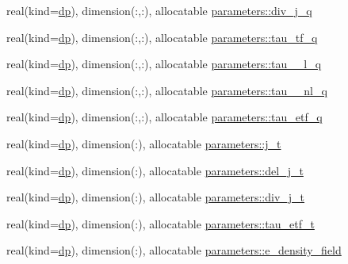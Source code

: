 \begin{DoxyCompactItemize}
real(kind=\mbox{\hyperlink{namespaceparameters_a52f8c6351fd79345d8811e065bcbbb37}{dp}}), dimension(\+:,\+:), allocatable \mbox{\hyperlink{group__OTHER__DENSITIES_ga8181dfebaf3cbf23118c8322b1eed86d}{parameters\+::div\+\_\+j\+\_\+q}}
\item 
real(kind=\mbox{\hyperlink{namespaceparameters_a52f8c6351fd79345d8811e065bcbbb37}{dp}}), dimension(\+:,\+:), allocatable \mbox{\hyperlink{group__OTHER__DENSITIES_gab6c3712299b2394aa1cdc011d9373ab8}{parameters\+::tau\+\_\+tf\+\_\+q}}
\item 
real(kind=\mbox{\hyperlink{namespaceparameters_a52f8c6351fd79345d8811e065bcbbb37}{dp}}), dimension(\+:,\+:), allocatable \mbox{\hyperlink{group__OTHER__DENSITIES_ga045973682837700d382d75a8f6de7d9c}{parameters\+::tau\+\_\+\_\+l\+\_\+q}}
\item 
real(kind=\mbox{\hyperlink{namespaceparameters_a52f8c6351fd79345d8811e065bcbbb37}{dp}}), dimension(\+:,\+:), allocatable \mbox{\hyperlink{group__OTHER__DENSITIES_ga64b5af532da52ba869f0fba447812146}{parameters\+::tau\+\_\+\_\+nl\+\_\+q}}
\item 
real(kind=\mbox{\hyperlink{namespaceparameters_a52f8c6351fd79345d8811e065bcbbb37}{dp}}), dimension(\+:,\+:), allocatable \mbox{\hyperlink{group__OTHER__DENSITIES_ga8fa22b66605b27eaece8dbd54577ebc8}{parameters\+::tau\+\_\+etf\+\_\+q}}
\item 
real(kind=\mbox{\hyperlink{namespaceparameters_a52f8c6351fd79345d8811e065bcbbb37}{dp}}), dimension(\+:), allocatable \mbox{\hyperlink{group__OTHER__DENSITIES_ga403b0aed00d1b8df4af16d47bc09977f}{parameters\+::j\+\_\+t}}
\item 
real(kind=\mbox{\hyperlink{namespaceparameters_a52f8c6351fd79345d8811e065bcbbb37}{dp}}), dimension(\+:), allocatable \mbox{\hyperlink{group__OTHER__DENSITIES_ga1c75e349365b3d0cd01f2f1ed6fc3a06}{parameters\+::del\+\_\+j\+\_\+t}}
\item 
real(kind=\mbox{\hyperlink{namespaceparameters_a52f8c6351fd79345d8811e065bcbbb37}{dp}}), dimension(\+:), allocatable \mbox{\hyperlink{group__OTHER__DENSITIES_gaae73460a531438ad3711b017dc727066}{parameters\+::div\+\_\+j\+\_\+t}}
\item 
real(kind=\mbox{\hyperlink{namespaceparameters_a52f8c6351fd79345d8811e065bcbbb37}{dp}}), dimension(\+:), allocatable \mbox{\hyperlink{group__OTHER__DENSITIES_ga38f8f27b19a3324faae16c6831f551db}{parameters\+::tau\+\_\+etf\+\_\+t}}
\item 
real(kind=\mbox{\hyperlink{namespaceparameters_a52f8c6351fd79345d8811e065bcbbb37}{dp}}), dimension(\+:), allocatable \mbox{\hyperlink{group__OTHER__DENSITIES_gadb82cb07fdaadb4c3d4fc703ec7d0f32}{parameters\+::e\+\_\+density\+\_\+field}}

\end{DoxyCompactItemize}

